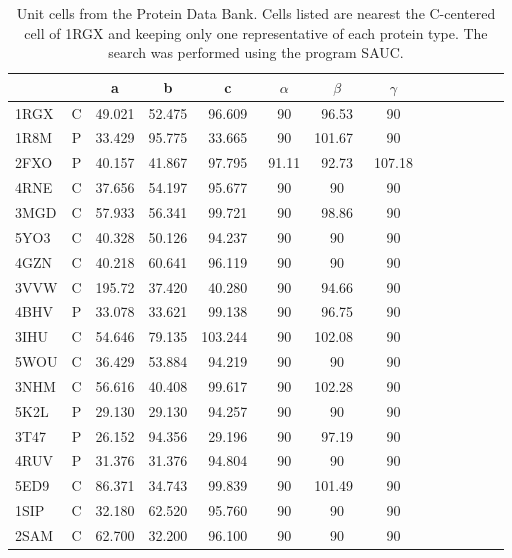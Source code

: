 \documentclass[preprint]{iucr}              %
\numberwithin{equation}{section}
\numberwithin{equation}{section}
\begin{document}
	\begin{table}
		\begin{center}
			\caption{Unit cells from the Protein Data Bank. Cells listed are nearest the C-centered cell of 1RGX and 
				keeping only one representative of each protein type. The search was performed 
				using the program SAUC.}		
			\vspace{3mm}
			\begin{tabular}{lcccccccclcccc} \toprule
				\rotatebox{0}{PDB}&& a&b&c&$\alpha$&$\beta$&$\gamma$ \\ \midrule
				1RGX  &  C &   49.021  &  52.475 &   96.609  &  90 &   96.53 &   90 \\
				1R8M &  P  & 33.429  & 95.775  & 33.665   & 90     & 101.67~  & 90   \\
				2FXO  & P  & 40.157  & 41.867  & 97.795   & 91.11  & 92.73   & 107.18 \\
				4RNE  & C  & 37.656  & 54.197  & 95.677   & 90     & 90      & 90    \\
				3MGD  & C  & 57.933  & 56.341  & 99.721   & 90     & 98.86   & 90   \\
				5YO3  & C  & 40.328  & 50.126  & 94.237   & 90     & 90      & 90   \\
				4GZN  & C  & 40.218  & 60.641  & 96.119   & 90     & 90      & 90   \\
				3VVW  & C  & 195.72  & 37.420  & 40.280   & 90     & 94.66   & 90   \\
				4BHV  & P  & 33.078  & 33.621  & 99.138   & 90     & 96.75   & 90   \\
				3IHU  & C  & 54.646  & 79.135  & 103.244~  & 90     & 102.08~  & 90   \\
				5WOU  & C  & 36.429  & 53.884  & 94.219   & 90     & 90      & 90   \\
				3NHM  & C  & 56.616  & 40.408  & 99.617   & 90     & 102.28~  & 90   \\
				5K2L  & P  & 29.130  & 29.130  & 94.257   & 90     & 90      & 90   \\
				3T47  & P  & 26.152  & 94.356  & 29.196   & 90     & 97.19   & 90   \\
				4RUV  & P  & 31.376  & 31.376  & 94.804   & 90     & 90      & 90   \\
				5ED9  & C  & 86.371  & 34.743  & 99.839   & 90     & 101.49~  & 90   \\
				1SIP  & C  & 32.180  & 62.520  & 95.760   & 90     & 90      & 90   \\
				2SAM  & C  & 62.700  & 32.200  & 96.100   & 90     & 90      & 90   \\

\end{tabular}
\end{center}
\end{table}
\end{document}
